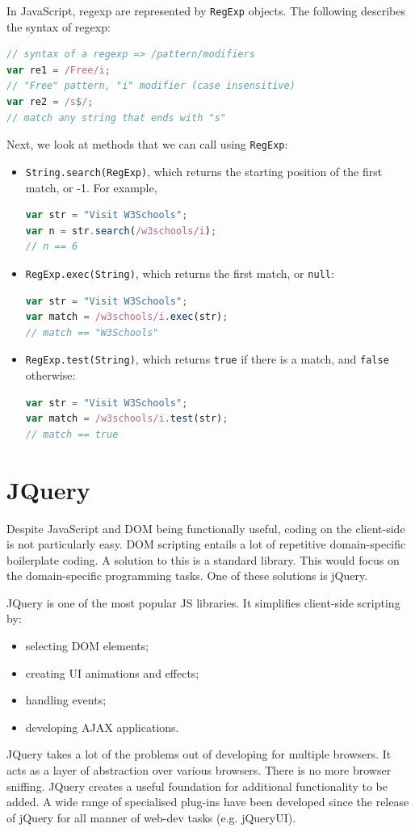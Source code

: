 \documentclass[a4paper, openany]{memoir}
\begin{document}
In JavaScript, regexp are represented by \texttt{RegExp} objects. The following describes the syntax of regexp:
\begin{lstlisting}[language=javascript]
// syntax of a regexp => /pattern/modifiers
var re1 = /Free/i;
// "Free" pattern, "i" modifier (case insensitive)
var re2 = /s$/;
// match any string that ends with "s"
\end{lstlisting}
Next, we look at methods that we can call using \texttt{RegExp}:
\begin{itemize}
    \item \texttt{String.search(RegExp)}, which returns the starting position of the first match, or -1. For example,
    \begin{lstlisting}[language=javascript]
var str = "Visit W3Schools";
var n = str.search(/w3schools/i);
// n == 6\end{lstlisting}
    
    \item \texttt{RegExp.exec(String)}, which returns the first match, or \texttt{null}:
    \begin{lstlisting}[language=javascript]
var str = "Visit W3Schools";
var match = /w3schools/i.exec(str);
// match == "W3Schools"\end{lstlisting}

    \item \texttt{RegExp.test(String)}, which returns \texttt{true} if there is a match, and \texttt{false} otherwise:
    \begin{lstlisting}[language=javascript]
var str = "Visit W3Schools";
var match = /w3schools/i.test(str);
// match == true\end{lstlisting}
\end{itemize}
\newpage

\section{JQuery}
Despite JavaScript and DOM being functionally useful, coding on the client-side is not particularly easy. DOM scripting entails a lot of repetitive domain-specific boilerplate coding. A solution to this is a standard library. This would focus on the domain-specific programming tasks. One of these solutions is jQuery.

JQuery is one of the most popular JS libraries. It simplifies client-side scripting by:
\begin{itemize}
    \item selecting DOM elements;
    \item creating UI animations and effects;
    \item handling events;
    \item developing AJAX applications.
\end{itemize}
JQuery takes a lot of the problems out of developing for multiple browsers. It acts as a layer of abstraction over various browsers. There is no more browser sniffing. JQuery creates a useful foundation for additional functionality to be added. A wide range of specialised plug-ins have been developed since the release of jQuery for all manner of web-dev tasks (e.g. jQueryUI).
\end{document}
